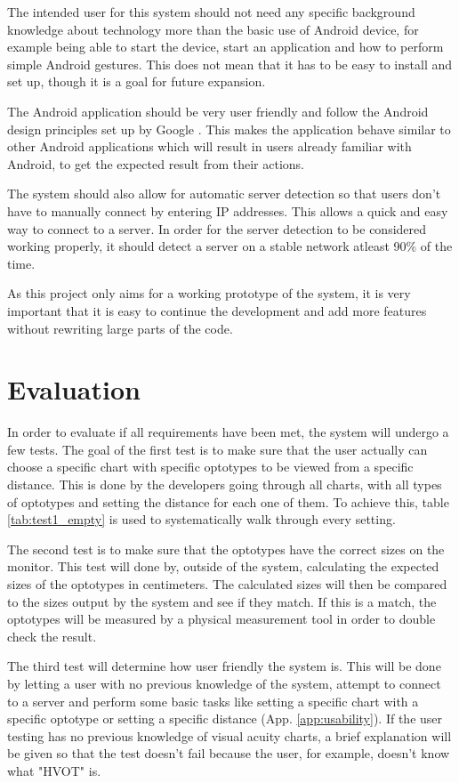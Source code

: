 \documentclass[12pt,a4paper,notitlepage]{report}
\begin{document}
The intended user for this system should not need any specific background knowledge about technology more than the basic use of Android device, for example being able to start the device, start an application and how to perform simple Android gestures. This does not mean that it has to be easy to install and set up, though it is a goal for future expansion. 

The Android application should be very user friendly and follow the Android design principles set up by Google \cite{android_design}. This makes the application behave similar to other Android applications which will result in users already familiar with Android, to get the expected result from their actions. 

The system should also allow for automatic server detection so that users don't have to manually connect by entering IP addresses. This allows a quick and easy way to connect to a server. In order for the server detection to be considered working properly, it should detect a server on a stable network atleast 90\% of the time.

As this project only aims for a working prototype of the system, it is very important that it is easy to continue the development and add more features without rewriting large parts of the code.

\section{Evaluation \label{sec:evaluation}}
In order to evaluate if all requirements have been met, the system will undergo a few tests. The goal of the first test is to make sure that the user actually can choose a specific chart with specific optotypes to be viewed from a specific distance. This is done by the developers going through all charts, with all types of optotypes and setting the distance for each one of them. To achieve this, table \ref{tab:test1_empty} is used to systematically walk through every setting.

The second test is to make sure that the optotypes have the correct sizes on the monitor. This test will done by, outside of the system, calculating the expected sizes of the optotypes in centimeters. The calculated sizes will then be compared to the sizes output by the system and see if they match. If this is a match, the optotypes will be measured by a physical measurement tool in order to double check the result.

The third test will determine how user friendly the system is. This will be done by letting a user with no previous knowledge of the system, attempt to connect to a server and perform some basic tasks like setting a specific chart with a specific optotype or setting a specific distance (App. \ref{app:usability}). If the user testing has no previous knowledge of visual acuity charts, a brief explanation will be given so that the test doesn't fail because the user, for example, doesn't know what "HVOT" is.
\end{document}
